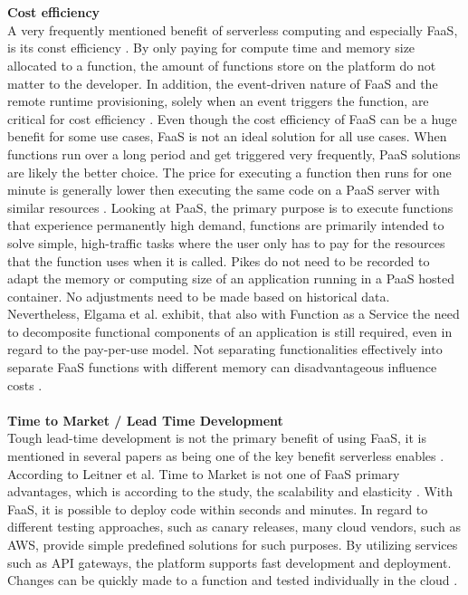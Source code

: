\documentclass[a4paper,twoside,11pt, pagesize]{scrartcl}
\begin{document}
\begin{spacing}{1.2}
\\\\ \textbf{Cost efficiency}\\ A very frequently mentioned benefit of serverless computing and especially FaaS, is its const efficiency \cite{lee2018evaluation}. By only paying for compute time and memory size allocated to a function, the amount of functions store on the platform do not matter to the developer. In addition, the event-driven nature of FaaS and the remote runtime provisioning, solely when an event triggers the function, are critical for cost efficiency \cite{feng2018exploring}. Even though the cost efficiency of FaaS can be a huge benefit for some use cases, FaaS is not an ideal solution for all use cases. When functions run over a long period and get triggered very frequently, PaaS solutions are likely the better choice. The price for executing a function then runs for one minute is generally lower then executing the same code on a PaaS server with similar resources \cite{jonas2019cloud}. Looking at PaaS, the primary purpose is to execute functions that experience permanently high demand, functions are primarily intended to solve simple, high-traffic tasks where the user only has to pay for the resources that the function uses when it is called. Pikes do not need to be recorded to adapt the memory or computing size of an application running in a PaaS hosted container. No adjustments need to be made based on historical data. Nevertheless, Elgama et al. exhibit, that also with Function as a Service the need to decomposite functional components of an application is still required, even in regard to the pay-per-use model. Not separating functionalities effectively into separate FaaS functions with different memory can disadvantageous influence costs \cite{elgamal2018costless}.\\\\ \textbf{Time to Market / Lead Time Development}\\ Tough lead-time development is not the primary benefit of using FaaS, it is mentioned in several papers as being one of the key benefit serverless enables \cite{adzic2017serverless} \cite{ast2017self}. According to Leitner et al. Time to Market is not one of FaaS primary advantages, which is according to the study, the scalability and elasticity \cite{leitner2019mixed}. With FaaS, it is possible to deploy code within seconds and minutes. In regard to different testing approaches, such as canary releases, many cloud vendors, such as AWS, provide simple predefined solutions for such purposes. By utilizing services such as API gateways, the platform supports fast development and deployment. Changes can be quickly made to a function and tested individually in the cloud \cite{sewak2018winning}.\\\\

\end{spacing}
\end{document}
